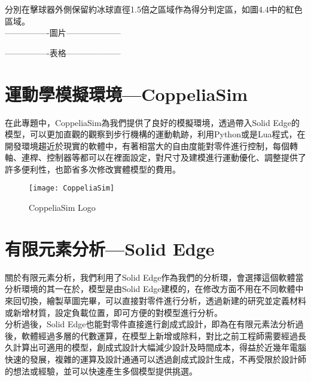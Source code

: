 \newpage
\qquad 分別在擊球器外側保留約冰球直徑1.5倍之區域作為得分判定區，如圖4.4中的紅色區域。\\

----------------圖片--------------------

----------------表格--------------------


\section{運動學模擬環境---CoppeliaSim}

在此專題中，CoppeliaSim為我們提供了良好的模擬環境，透過帶入Solid Edge的模型，可以更加直觀的觀察到步行機構的運動軌跡，利用Python或是Lua程式，在開發環境趨近於現實的軟體中，有著相當大的自由度能對零件進行控制，每個轉軸、連桿、控制器等都可以在裡面設定，對尺寸及建模進行運動優化、調整提供了許多便利性，也節省多次修改實體模型的費用。\\

 \begin{figure}[hbt!]
\center
\texttt{[image: CoppeliaSim]}
\caption{\Large CoppeliaSim Logo}
\end{figure}
\newpage

\section{有限元素分析—Solid Edge}

關於有限元素分析，我們利用了Solid Edge作為我們的分析環，會選擇這個軟體當分析環境的其一在於，模型是由Solid Edge建模的，在修改方面不用在不同軟體中來回切換，繪製草圖完畢，可以直接對零件進行分析，透過新建的研究並定義材料或新增材質，設定負載位置，即可方便的對模型進行分析。\\
分析過後，Solid Edge也能對零件直接進行創成式設計，即為在有限元素法分析過後，軟體經過多層的代數運算，在模型上新增或除料，對比之前工程師需要經過長久計算出可適用的模型，創成式設計大幅減少設計及時間成本，得益於近幾年電腦快速的發展，複雜的運算及設計通通可以透過創成式設計生成，不再受限於設計師的想法或經驗，並可以快速產生多個模型提供挑選。\\

